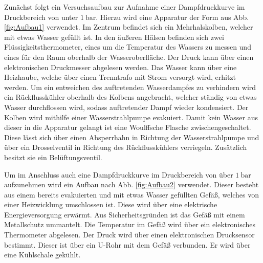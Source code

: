 Zunächst folgt ein Versuchsaufbau zur Aufnahme einer Dampfdruckkurve im Druckbereich
 von unter $\SI{1}{\bar}$. Hierzu wird eine Apparatur der Form aus Abb. \ref{fig:Aufbau1} verwendet.
   Im Zentrum befindet sich ein Mehrhalskolben, welcher mit etwas Wasser gefüllt ist.
    In den äußeren Hälsen befinden sich zwei Flüssigkeitsthermometer, eines um die
     Temperatur des Wassers zu messen und eines für den Raum oberhalb der
      Wasseroberfläche. Der Druck kann über einen elektronischen Druckmesser abgelesen werden.
       Das Wasser kann über eine Heizhaube, welche über einen
       Trenntrafo mit Strom versorgt wird, erhitzt werden. Um ein entweichen
        des auftretenden Wasserdampfes zu verhindern
         wird ein Rückflusskühler oberhalb des Kolbens angebracht, welcher
         ständig von etwas Wasser durchflossen wird, sodass auftretender Dampf
          wieder kondensiert. Der Kolben wird mithilfe einer Wasserstrahlpumpe evakuiert.
           Damit kein Wasser aus dieser in die Apparatur gelangt ist eine
            Woulffsche Flasche zwischengeschaltet. Diese lässt sich über einen
             Absperrhahn in Richtung der Wasserstrahlpumpe und über ein Drosselventil
              in Richtung des Rückflusskühlers verriegeln. Zusätzlich besitzt sie ein Belüftungsventil.

            Um im Anschluss auch eine Dampfdruckkurve im Druckbereich von über
             $\SI{1}{\bar}$ aufzunehmen wird ein Aufbau nach Abb. \ref{fig:Aufbau2} verwendet.
              Dieser besteht aus einem bereits evakuierten und mit etwas Wasser
               gefüllten Gefäß, welches von einer Heizwicklung umschlossen ist.
                Diese wird über eine elektrische Energieversorgung erwärmt. Aus
                 Sicherheitsgründen ist das Gefäß mit einem Metallschutz
                  ummantelt. Die Temperatur im Gefäß wird über ein elektronisches
                   Thermometer abgelesen. Der Druck wird über einen elektronischen
                   Drucksensor bestimmt. Dieser ist über ein U-Rohr mit dem Gefäß
                   verbunden. Er wird über eine Kühlschale gekühlt.
